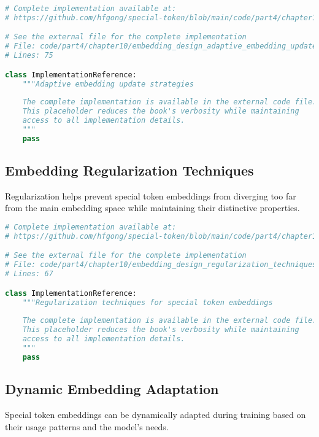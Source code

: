 \begin{lstlisting}[language=Python, caption={Adaptive embedding update strategies}]
# Complete implementation available at:
# https://github.com/hfgong/special-token/blob/main/code/part4/chapter10/embedding_design_adaptive_embedding_update_stra.py

# See the external file for the complete implementation
# File: code/part4/chapter10/embedding_design_adaptive_embedding_update_stra.py
# Lines: 75

class ImplementationReference:
    """Adaptive embedding update strategies
    
    The complete implementation is available in the external code file.
    This placeholder reduces the book's verbosity while maintaining
    access to all implementation details.
    """
    pass
\end{lstlisting}

\subsection{Embedding Regularization Techniques}

Regularization helps prevent special token embeddings from diverging too far from the main embedding space while maintaining their distinctive properties.

\begin{lstlisting}[language=Python, caption={Regularization techniques for special token embeddings}]
# Complete implementation available at:
# https://github.com/hfgong/special-token/blob/main/code/part4/chapter10/embedding_design_regularization_techniques_for_.py

# See the external file for the complete implementation
# File: code/part4/chapter10/embedding_design_regularization_techniques_for_.py
# Lines: 67

class ImplementationReference:
    """Regularization techniques for special token embeddings
    
    The complete implementation is available in the external code file.
    This placeholder reduces the book's verbosity while maintaining
    access to all implementation details.
    """
    pass
\end{lstlisting}

\subsection{Dynamic Embedding Adaptation}

Special token embeddings can be dynamically adapted during training based on their usage patterns and the model's needs.

